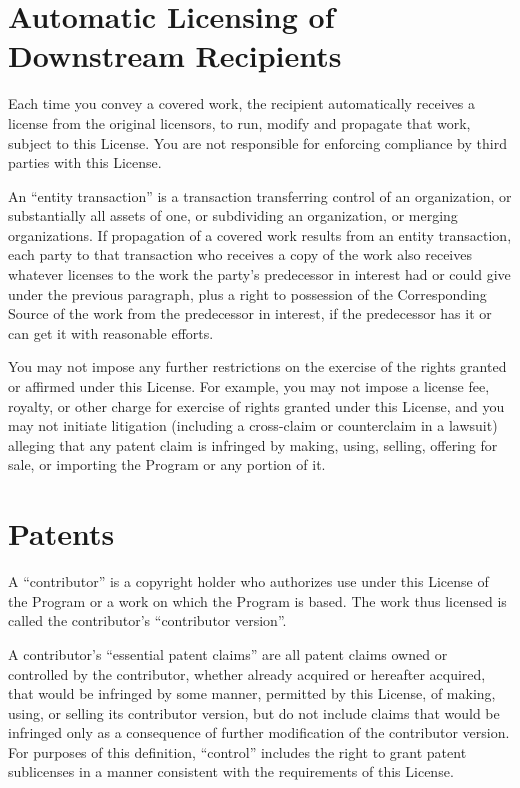 \section{Automatic Licensing of Downstream Recipients}

Each time you convey a covered work, the recipient automatically receives a license from the original licensors, to run, modify and propagate that work, subject to this License. You are not responsible for enforcing compliance by third parties with this License.

An “entity transaction” is a transaction transferring control of an organization, or substantially all assets of one, or subdividing an organization, or merging organizations. If propagation of a covered work results from an entity transaction, each party to that transaction who receives a copy of the work also receives whatever licenses to the work the party's predecessor in interest had or could give under the previous paragraph, plus a right to possession of the Corresponding Source of the work from the predecessor in interest, if the predecessor has it or can get it with reasonable efforts.

You may not impose any further restrictions on the exercise of the rights granted or affirmed under this License. For example, you may not impose a license fee, royalty, or other charge for exercise of rights granted under this License, and you may not initiate litigation (including a cross-claim or counterclaim in a lawsuit) alleging that any patent claim is infringed by making, using, selling, offering for sale, or importing the Program or any portion of it.
\section{Patents}

A “contributor” is a copyright holder who authorizes use under this License of the Program or a work on which the Program is based. The work thus licensed is called the contributor's “contributor version”.

A contributor's “essential patent claims” are all patent claims owned or controlled by the contributor, whether already acquired or hereafter acquired, that would be infringed by some manner, permitted by this License, of making, using, or selling its contributor version, but do not include claims that would be infringed only as a consequence of further modification of the contributor version. For purposes of this definition, “control” includes the right to grant patent sublicenses in a manner consistent with the requirements of this License.

